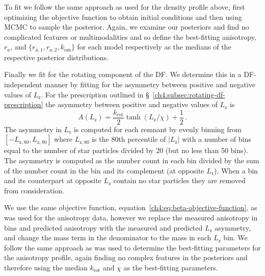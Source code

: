To fit we follow the same approach as used for the density profile above, first optimizing the objective function to obtain initial conditions and then using MCMC to sample the posterior. Again, we examine our posteriors and find no complicated features or multimodalities and so define the best-fitting anisotropy, $r_{a}$, and $\{ r_{a,1},r_{a,2},k_\mathrm{om} \}$ for each model respectively as the medians of the respective posterior distributions.



Finally we fit for the rotating component of the DF. We determine this in a DF-independent manner by fitting for the asymmetry between positive and negative values of $L_{\mathrm{z}}$. For the prescription outlined in \S~\ref{ch4:subsec:rotating-df-prescription} the asymmetry between positive and negative values of $L_{\mathrm{z}}$ is
\begin{equation}
    \label{ch4:eq:Lz-anisotropy}
    A(L_{\mathrm{z}}) = \frac{k_\mathrm{rot}}{2} \tanh(L_{\mathrm{z}}/\chi) + \frac{1}{2}\,.
\end{equation}
\noindent The asymmetry in $L_{\mathrm{z}}$ is computed for each remnant by evenly binning from $[-L_{\mathrm{z},80},L_{\mathrm{z},80}]$ where $L_{\mathrm{z},80}$ is the 80th percentile of $\lvert L_{\mathrm{z}} \rvert$ with a number of bins equal to the number of star particles divided by 20 (but no less than 50 bins). The asymmetry is computed as the number count in each bin divided by the sum of the number count in the bin and its complement (at opposite $L_{\mathrm{z}}$). When a bin and its counterpart at opposite $L_{\mathrm{z}}$ contain no star particles they are removed from consideration. 

We use the same objective function, equation~\eqref{ch4:eq:beta-objective-function}, as was used for the anisotropy data, however we replace the measured anisotropy in bins and predicted anisotropy with the measured and predicted $L_{\mathrm{z}}$ asymmetry, and change the mass term in the denominator to the mass in each $L_{\mathrm{z}}$ bin. We follow the same approach as was used to determine the best-fitting parameters for the anisotropy profile, again finding no complex features in the posteriors and therefore using the median $k_\mathrm{rot}$ and $\chi$ as the best-fitting parameters.

